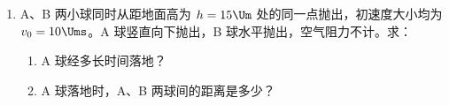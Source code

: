 \documentclass[\gkver]{gaokaozhenti}
\begin{document}
\begin{enumerate}
\begin{enumerate}
	\item
	利用如图所示的电路测量电流表 G 的内阻（图中电源的电动势 $E=4\UV$）：先闭合 $S_{1}$，调节 $R$，使电流表指针偏转到满刻度；再闭合 $S_{2}$，保持 $R$ 不变，调节 $R'$，使电流表指针偏转到满刻度的 2/3，读出此时 $R'$ 的阻值为 $200\UO$，则电流表内阻的测量值 $R_{g}=$ $\UO$。

	\item
	将该表改装成量程为 $3\UV$ 的电压表，需 （填“串联”或“并联”）阻值为 $R_{0}=$ $\UO$ 的电阻。

	\item
	把改装好的电压表与标准电压表进行核对，试在答题卡上画出实验电路图和实物连接图。
\end{enumerate}




\item
A、B 两小球同时从距地面高为 $h=15\Um$ 处的同一点抛出，初速度大小均为 $v_{0}=10\Ums$。A 球竖直向下抛出，B 球水平抛出，空气阻力不计。求：

\begin{enumerate}
	\item
	A 球经多长时间落地？

	\item
	A 球落地时，A、B 两球间的距离是多少？
\end{enumerate}

\end{enumerate}
\end{document}
